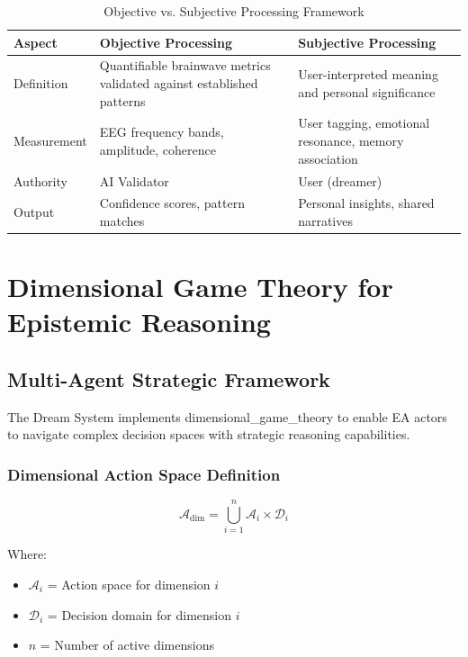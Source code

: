 \documentclass[12pt,a4paper]{article}
\begin{document}
\begin{table}[h]
\centering
\begin{tabular}{|l|p{6cm}|p{6cm}|}
\hline
\textbf{Aspect} & \textbf{Objective Processing} & \textbf{Subjective Processing} \\
\hline
Definition & Quantifiable brainwave metrics validated against established patterns & User-interpreted meaning and personal significance \\
\hline
Measurement & EEG frequency bands, amplitude, coherence & User tagging, emotional resonance, memory association \\
\hline
Authority & AI Validator & User (dreamer) \\
\hline
Output & Confidence scores, pattern matches & Personal insights, shared narratives \\
\hline
\end{tabular}
\caption{Objective vs. Subjective Processing Framework}
\end{table}

\section{Dimensional Game Theory for Epistemic Reasoning}

\subsection{Multi-Agent Strategic Framework}

The Dream System implements \gls{dimensional_game_theory} to enable EA actors to navigate complex decision spaces with strategic reasoning capabilities.

\subsubsection{Dimensional Action Space Definition}

\begin{equation}
\mathcal{A}_{\text{dim}} = \bigcup_{i=1}^{n} \mathcal{A}_i \times \mathcal{D}_i
\end{equation}

Where:
\begin{itemize}
    \item $\mathcal{A}_i$ = Action space for dimension $i$
    \item $\mathcal{D}_i$ = Decision domain for dimension $i$
    \item $n$ = Number of active dimensions
\end{itemize}
\end{document}
